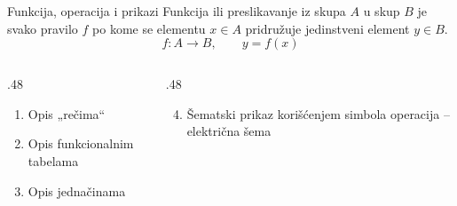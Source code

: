 \begin{frame}[label=01-s010]{Funkcija, operacija i prikazi}
Funkcija ili preslikavanje iz skupa \(A\) u skup \(B\) je svako pravilo \(f\) po kome se elementu \(x\in A\) pridružuje jedinstveni element \(y\in B\).
\[\boxed{f:A\to B,\qquad y=f(x)}\]
\begin{columns}[T,onlytextwidth]
\begin{column}{.48\textwidth}\begin{enumerate}\item Opis „rečima“\item Opis funkcionalnim tabelama\item Opis jednačinama\end{enumerate}\end{column}
\begin{column}{.48\textwidth}\begin{enumerate}\setcounter{enumi}{3}\item Šematski prikaz korišćenjem simbola operacija – električna šema\end{enumerate}\end{column}\end{columns}

\end{frame}
